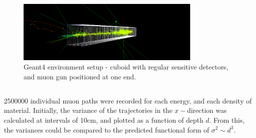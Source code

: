 \documentclass{article}
\numberwithin{equation}{section}
\begin{document}
\begin{figure}[H]
  \centering
  \includegraphics[width=0.8\textwidth]{figures/GEANT4/muon_detector_setup}
  \caption{Geant4 environment setup - cuboid with regular sensitive detectors, and muon gun positioned at one end.}
  \hfill
\end{figure}

\subsection{}
2500000 individual muon paths were recorded for each energy, and each density of material. Initially, the variance of the trajectories in the $x-$direction was calculated at intervals of 10cm, and plotted as a function of depth $d$. From this, the variances could be compared to the predicted functional form of $\sigma^2 \sim d^3$.
\end{document}
